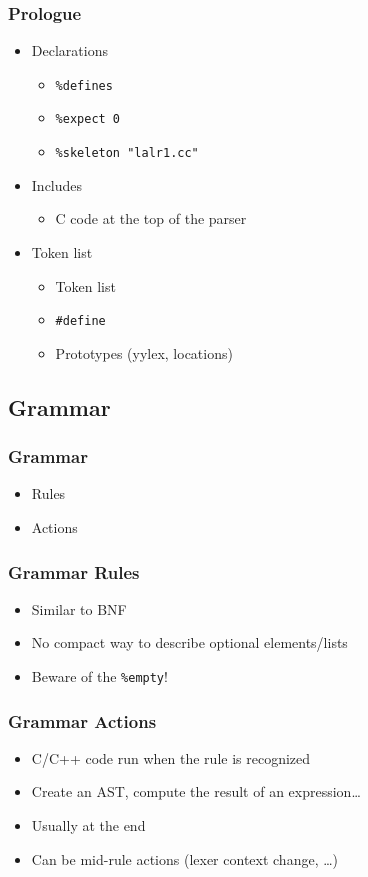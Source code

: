 \documentclass{beamer}
\begin{document}
\begin{frame}
  \frametitle{Prologue}
    \begin{itemize}
      \item Declarations
      \begin{itemize}
        \item \texttt{\%defines}
        \item \texttt{\%expect 0}
        \item \texttt{\%skeleton "lalr1.cc"}
      \end{itemize}
      \item Includes
      \begin{itemize}
        \item C code at the top of the parser
      \end{itemize}
      \item Token list
      \begin{itemize}
        \item Token list
        \item \texttt{\#define}
        \item Prototypes (yylex, locations)
      \end{itemize}
  \end{itemize}
\end{frame}

\subsection{Grammar}

\begin{frame}
  \frametitle{Grammar}
    \begin{itemize}
      \item Rules
      \item Actions
    \end{itemize}
\end{frame}

\begin{frame}
  \frametitle{Grammar Rules}
    \begin{itemize}
      \item Similar to BNF
      \item No compact way to describe optional elements/lists
      \item Beware of the \texttt{\%empty}!
    \end{itemize}
\end{frame}

\begin{frame}
  \frametitle{Grammar Actions}
    \begin{itemize}
      \item C/C++ code run when the rule is recognized
      \item Create an AST, compute the result of an expression\ldots
      \item Usually at the end
      \item Can be mid-rule actions (lexer context change, \ldots)
    \end{itemize}
\end{frame}
\end{document}
